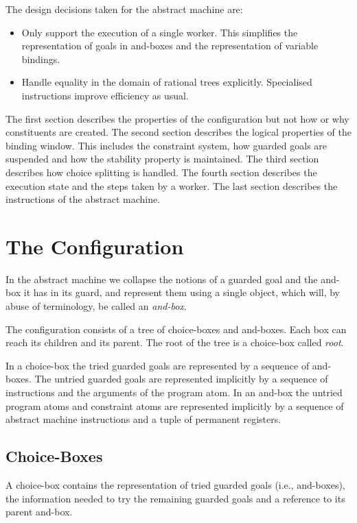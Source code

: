 The design decisions taken for the abstract machine are:
%
\begin{itemize}
\item Only support the execution of a single worker. This simplifies the
representation of goals in and-boxes and the representation of variable
bindings.
\item Handle equality in the domain of rational trees explicitly. 
Specialised instructions improve efficiency as usual.
\end{itemize}
%
The first section describes the properties of the configuration but
not how or why constituents are created. The second section describes
the logical properties of the binding window. This includes the
constraint system, how guarded goals are suspended and how the stability 
property is maintained.  The third section describes how choice
splitting is handled. The fourth section describes the execution state
and the steps taken by a worker. The last section describes the
instructions of the abstract machine.


\section{The Configuration}

In the abstract machine we collapse the notions of a guarded goal and
the and-box it has in its guard, and represent them using a single
object, which will, by abuse of terminology, be called an {\em
and-box}.

The configuration consists of a tree of choice-boxes and and-boxes.
Each box can reach its children and its parent.  The root of the tree
is a choice-box called {\em root}.

In a choice-box the tried guarded goals are represented by a sequence
of and-boxes. The untried guarded goals are represented implicitly by
a sequence of instructions and the arguments of the program atom. In
an and-box the untried program atoms and constraint atoms are
represented implicitly by a sequence of abstract machine instructions
and a tuple of permanent registers.

\subsection*{Choice-Boxes}

A choice-box contains the representation of tried guarded goals (i.e.,
and-boxes), the information needed to try the remaining guarded goals
and a reference to its parent and-box.

